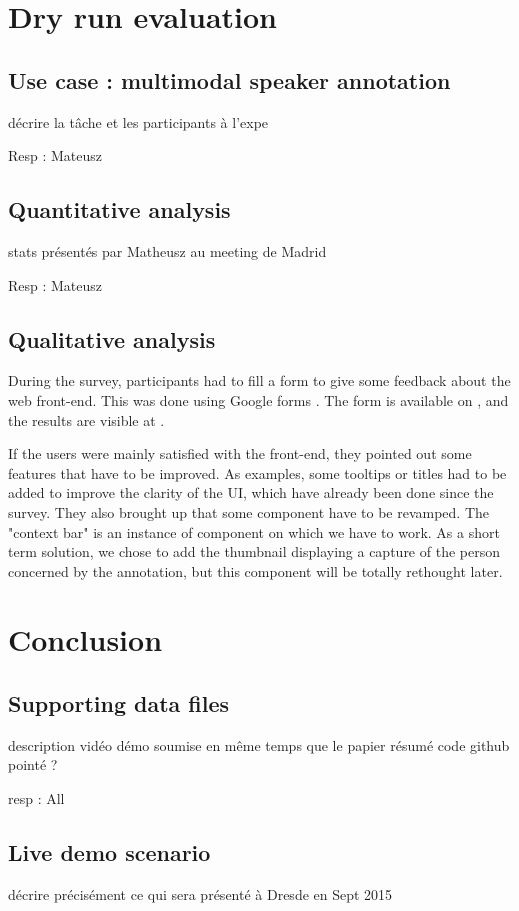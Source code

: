 \documentclass[a4paper]{article}
\begin{document}
  \section{Dry run evaluation}
      \subsection{Use case : multimodal speaker annotation}
     
décrire la tâche et les participants à l'expe

Resp : Mateusz
      
      \subsection{Quantitative analysis}
    
stats présentés par Matheusz au meeting de Madrid

Resp : Mateusz
  
     \subsection{Qualitative analysis}
    

During the survey, participants had to fill a form to give some  feedback about the web front-end. This was done using Google forms \cite{url-google-forms}. The form is available on \cite{url-list-form}, and the results are visible at \cite{url-list-form-results}.

If the users were mainly satisfied with the front-end, they pointed out some features that have to be improved. As examples, some tooltips or titles had to be added to improve the clarity of the UI, which have already been done since the survey. They also brought up that some component have to be revamped. The "context bar" is an instance of component on which we have to work. As a short term solution, we chose to add the thumbnail displaying a capture of the person concerned by the annotation, but this component will be totally rethought later.




  \section{Conclusion}
  
    \subsection{Supporting data files}

description vidéo démo soumise en même temps que le papier
résumé code github pointé ?    

resp : All

    \subsection{Live demo scenario}

décrire précisément ce qui sera présenté à Dresde en Sept 2015

  
  \newpage
  \eightpt
  
  
  
\end{document}

